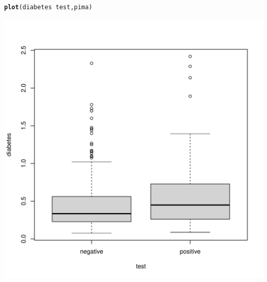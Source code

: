 \documentclass[11pt, a4paper]{article}\usepackage[]{graphicx}\usepackage[]{xcolor}
\makeatletter
\def\maxwidth{ %
  \ifdim\Gin@nat@width>\linewidth
    \linewidth
  \else
    \Gin@nat@width
  \fi
}
\newcommand{\hlopt}[1]{\textcolor[rgb]{0,0,0}{#1}}%
\newcommand{\hlstd}[1]{\textcolor[rgb]{0.345,0.345,0.345}{#1}}%
\newcommand{\hlkwd}[1]{\textcolor[rgb]{0.737,0.353,0.396}{\textbf{#1}}}%
\newenvironment{kframe}{%
 \def\at@end@of@kframe{}%
 \ifinner\ifhmode%
  \def\at@end@of@kframe{\end{minipage}}%
  \begin{minipage}{\columnwidth}%
 \fi\fi%
 \def\FrameCommand##1{\hskip\@totalleftmargin \hskip-\fboxsep
 \colorbox{shadecolor}{##1}\hskip-\fboxsep
     \hskip-\linewidth \hskip-\@totalleftmargin \hskip\columnwidth}%
 \MakeFramed {\advance\hsize-\width
   \@totalleftmargin\z@ \linewidth\hsize
   \@setminipage}}%
 {\par\unskip\endMakeFramed%
 \at@end@of@kframe}
\newenvironment{knitrout}{}{} %
\makeatother
\begin{document}
\begin{knitrout}
\color{fgcolor}\begin{kframe}
\begin{alltt}
\hlkwd{plot}\hlstd{(diabetes} \hlopt{~} \hlstd{test, pima)}
\end{alltt}
\end{kframe}
\includegraphics[width=\maxwidth]{figure/unnamed-chunk-14-1} 
\end{knitrout}
\end{document}

